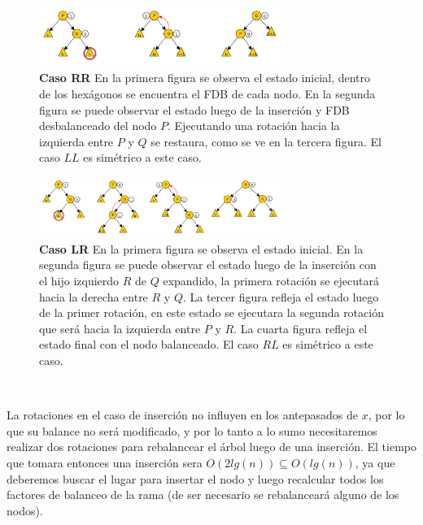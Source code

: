 ~

\begin{figure}
 \centering
 \includegraphics[width=0.70\textwidth]{graficos/RotacionSimpleAVL.pdf}
 \caption*{\newline \footnotesize \textbf{Caso RR} En la primera figura se observa el estado inicial, dentro de los hex\'agonos se encuentra el FDB de cada nodo. En la segunda figura se puede observar el estado luego de la inserci\'on y FDB desbalanceado del nodo $P$. Ejecutando una rotaci\'on hacia la izquierda entre $P$ y $Q$ se restaura, como se ve en la tercera figura. El caso $LL$ es sim\'etrico a este caso.}
\end{figure}

\newpage
\begin{figure}
 \centering
 \includegraphics[width=0.70\textwidth]{graficos/RotacionDobleAVL.pdf}
 \caption*{\newline \footnotesize \textbf{Caso LR} En la primera figura se observa el estado inicial. En la segunda figura se puede observar el estado luego de la inserci\'on con el hijo izquierdo $R$ de $Q$ expandido, la primera rotaci\'on se ejecutar\'a hacia la derecha entre $R$ y $Q$. La tercer figura refleja el estado luego de la primer rotaci\'on, en este estado se ejecutara la segunda rotaci\'on que ser\'a hacia la izquierda entre $P$ y $R$. La cuarta figura refleja el estado final con el nodo balanceado. El caso $RL$ es sim\'etrico a este caso.}
\end{figure}

~

La rotaciones en el caso de inserci\'on no influyen en los antepasados de $x$, por lo que su balance no ser\'a modificado, y por lo tanto a lo sumo necesitaremos realizar dos rotaciones para rebalancear el \'arbol luego de una inserci\'on. El tiempo que tomara entonces una inserci\'on sera $O(2lg(n)) \subseteq O(lg(n))$, ya que deberemos buscar el lugar para insertar el nodo y luego recalcular todos los factores de balanceo de la rama (de ser necesario se rebalancear\'a alguno de los nodos).

